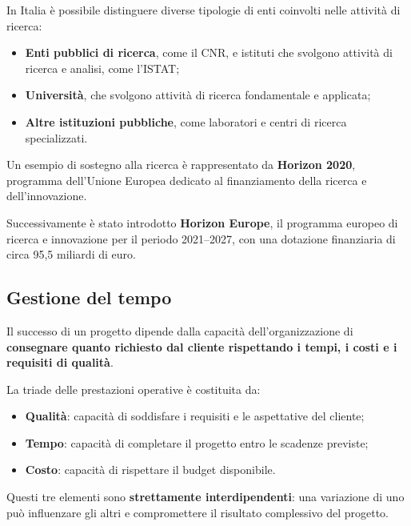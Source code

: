 \noindent In Italia è possibile distinguere diverse tipologie di enti coinvolti nelle attività di ricerca:

\begin{itemize}
    \item \textbf{Enti pubblici di ricerca}, come il CNR, e istituti che svolgono attività di ricerca e analisi, come l'ISTAT;
    \item \textbf{Università}, che svolgono attività di ricerca fondamentale e applicata;
    \item \textbf{Altre istituzioni pubbliche}, come laboratori e centri di ricerca specializzati.
\end{itemize}

\medskip

\noindent Un esempio di sostegno alla ricerca è rappresentato da \textbf{Horizon 2020}, programma dell'Unione Europea dedicato al 
finanziamento della ricerca e dell'innovazione.

\medskip

\noindent Successivamente è stato introdotto \textbf{Horizon Europe}, il programma europeo di ricerca e 
innovazione per il periodo 2021--2027, con una dotazione finanziaria di circa 95,5 miliardi di euro.

\subsection{Gestione del tempo}

\noindent Il successo di un progetto dipende dalla capacità dell'organizzazione di \textbf{consegnare quanto richiesto dal cliente rispettando i tempi, i costi e i requisiti di qualità}.

\medskip

\noindent La triade delle prestazioni operative è costituita da:

\begin{itemize}
    \item \textbf{Qualità}: capacità di soddisfare i requisiti e le aspettative del cliente;
    \item \textbf{Tempo}: capacità di completare il progetto entro le scadenze previste;
    \item \textbf{Costo}: capacità di rispettare il budget disponibile.
\end{itemize}

\noindent Questi tre elementi sono \textbf{strettamente interdipendenti}: una variazione di uno può influenzare gli altri e compromettere 
il risultato complessivo del progetto.

